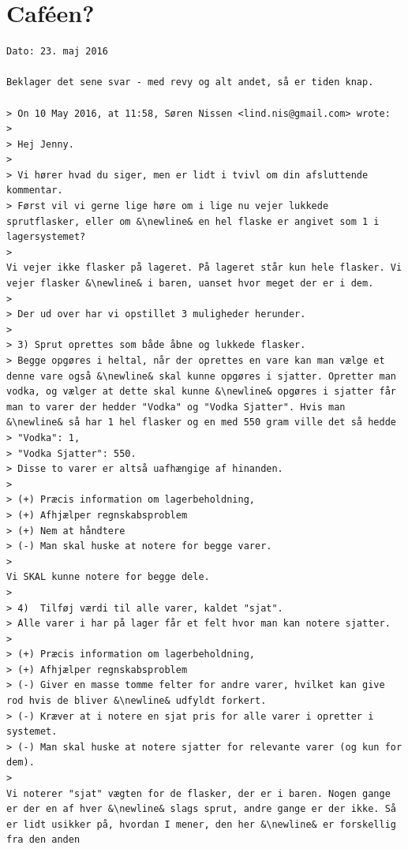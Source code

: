 \documentclass[]{article}
\begin{document}
\section*{Caféen?}
\begin{lstlisting}[language=Gmail]
Dato: 23. maj 2016

Beklager det sene svar - med revy og alt andet, så er tiden knap. 

> On 10 May 2016, at 11:58, Søren Nissen <lind.nis@gmail.com> wrote:
>
> Hej Jenny. 
> 
> Vi hører hvad du siger, men er lidt i tvivl om din afsluttende kommentar. 
> Først vil vi gerne lige høre om i lige nu vejer lukkede sprutflasker, eller om &\newline& en hel flaske er angivet som 1 i lagersystemet?
>
Vi vejer ikke flasker på lageret. På lageret står kun hele flasker. Vi vejer flasker &\newline& i baren, uanset hvor meget der er i dem. 
>
> Der ud over har vi opstillet 3 muligheder herunder. 
>
> 3) Sprut oprettes som både åbne og lukkede flasker. 
> Begge opgøres i heltal, når der oprettes en vare kan man vælge et denne vare også &\newline& skal kunne opgøres i sjatter. Opretter man vodka, og vælger at dette skal kunne &\newline& opgøres i sjatter får man to varer der hedder "Vodka" og "Vodka Sjatter". Hvis man &\newline& så har 1 hel flasker og en med 550 gram ville det så hedde 
> "Vodka": 1, 
> "Vodka Sjatter": 550.
> Disse to varer er altså uafhængige af hinanden. 
>
> (+) Præcis information om lagerbeholdning,
> (+) Afhjælper regnskabsproblem
> (+) Nem at håndtere
> (-) Man skal huske at notere for begge varer.
>
Vi SKAL kunne notere for begge dele. 
>
> 4)  Tilføj værdi til alle varer, kaldet "sjat".
> Alle varer i har på lager får et felt hvor man kan notere sjatter. 
>
> (+) Præcis information om lagerbeholdning,
> (+) Afhjælper regnskabsproblem
> (-) Giver en masse tomme felter for andre varer, hvilket kan give rod hvis de bliver &\newline& udfyldt forkert. 
> (-) Kræver at i notere en sjat pris for alle varer i opretter i systemet.
> (-) Man skal huske at notere sjatter for relevante varer (og kun for dem).
>
Vi noterer "sjat" vægten for de flasker, der er i baren. Nogen gange er der en af hver &\newline& slags sprut, andre gange er der ikke. Så er lidt usikker på, hvordan I mener, den her &\newline& er forskellig fra den anden

\end{lstlisting}
\end{document}
